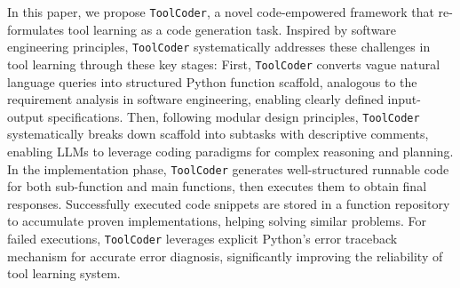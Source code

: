 In this paper, we propose \texttt{ToolCoder}, a novel code-empowered framework that re-formulates tool learning as a code generation task. 
Inspired by software engineering principles, \texttt{ToolCoder} systematically addresses these challenges in tool learning through these key stages: 
First, \texttt{ToolCoder} converts vague natural language queries into structured Python function scaffold, analogous to the requirement analysis in software engineering, enabling clearly defined input-output specifications. 
Then, following modular design principles, \texttt{ToolCoder} systematically breaks down scaffold into subtasks with descriptive comments, enabling LLMs to leverage coding paradigms for complex reasoning and planning.
In the implementation phase, \texttt{ToolCoder} generates well-structured runnable code for both sub-function and main functions, then executes them to obtain final responses. Successfully executed code snippets are stored in a function repository to accumulate proven implementations, helping solving similar problems.
For failed executions, \texttt{ToolCoder} leverages explicit Python's error traceback mechanism for accurate error diagnosis, significantly improving the reliability of tool learning system.



